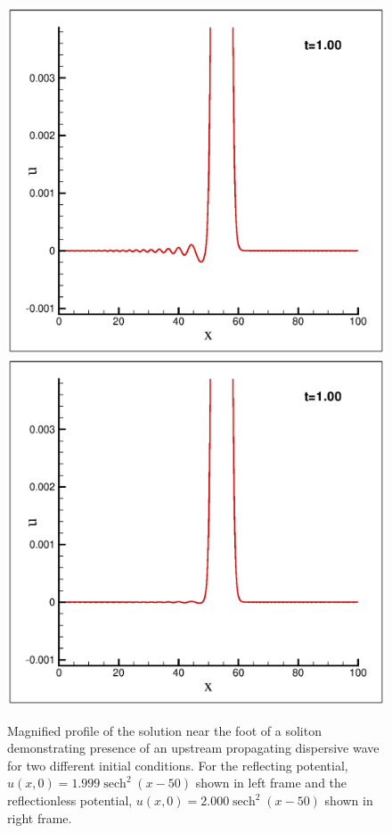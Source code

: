 \documentclass{svjour3}                    %
\DeclareMathOperator{\sech}{sech}
\begin{document}
\begin{figure}[h!]
\centerline{
\includegraphics[width=0.5\linewidth]{Fig_2a}
\includegraphics[width=0.5\linewidth]{Fig_2b}
}
\caption{Magnified profile of the solution near the foot of a soliton demonstrating presence of an upstream propagating dispersive wave for two different initial conditions. For the reflecting potential, $u(x,0)=1.999\sech^2(x-50)$ shown in left frame and the reflectionless potential, $u(x,0)=2.000\sech^2(x-50)$ shown in right frame.}
\label{fig:reflect}
\end{figure}
\end{document}
